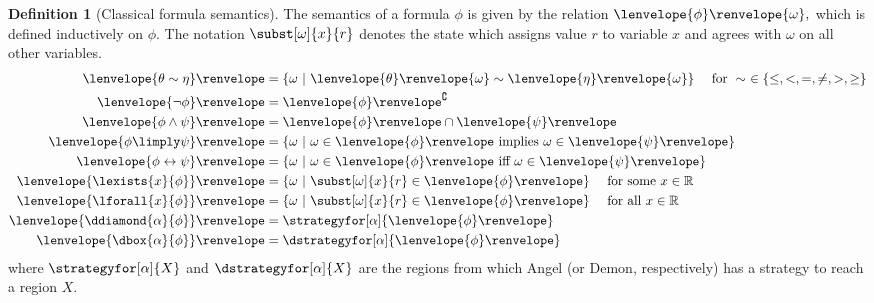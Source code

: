 \documentclass[12pt]{cmuthesis}
\theoremstyle{definition}
\newtheorem{definition}{Definition}
\theoremstyle{remark}
\newcommand{\lequiv}{\leftrightarrow}
\newcommand{\om}{\omega}
\newcommand{\tint}[2]{\lenvelope{#1}\renvelope{#2}}
\newcommand{\fint}[1]{\lenvelope{#1}\renvelope}
\begin{document}
\begin{definition}[Classical formula semantics]\label{def:dgl-sem-fml}
The semantics of a formula $\phi$ is given by the relation $\fint{\phi}{\om},$ which is defined inductively on $\phi$.
The notation $\subst[\om]{x}{r}$ denotes the state which assigns value $r$ to variable $x$ and agrees with $\om$ on all other variables.
\begin{align*}
\fint{\theta \sim \eta}  &= \{\om~|~\tint{\theta}{\om} \sim \tint{\eta}{\om}\}  \ \ \ \text{ for }\sim~\in \{\leq,<,=,\neq,>,\geq\}\\
\fint{\neg \phi}         &= \fint{\phi}^\complement  \\
\fint{\phi \land \psi}   &= \fint{\phi} \cap \fint{\psi}\\
\fint{\phi \limply \psi} &= \{\om~|~ \om \in \fint{\phi} \text{ implies } \om \in \fint{\psi}\}\\
\fint{\phi \lequiv \psi} &= \{\om~|~ \om \in \fint{\phi} \text{ iff } \om \in \fint{\psi}\}\\
\fint{\lexists{x}{\phi}} &= \{\om~|~ \subst[\om]{x}{r} \in \fint{\phi}\}  \ \ \ \text{ for some }x \in \mathbb{R}\\
\fint{\lforall{x}{\phi}} &= \{\om~|~ \subst[\om]{x}{r} \in \fint{\phi}\}  \ \ \ \text{ for all }x \in \mathbb{R}\\
\fint{\ddiamond{\alpha}{\phi}} &=  \strategyfor[\alpha]{\fint{\phi}}\\
\fint{\dbox{\alpha}{\phi}} &= \dstrategyfor[\alpha]{\fint{\phi}}
\end{align*}
where $\strategyfor[\alpha]{X}$ and $\dstrategyfor[\alpha]{X}$ are the regions from which Angel (or Demon, respectively) has a strategy to reach a region $X$.
\end{definition}
\end{document}

